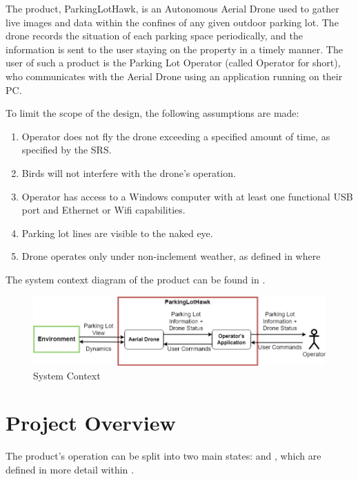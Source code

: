 \documentclass[12pt, titlepage]{article}
\begin{document}
The product, ParkingLotHawk, is an Autonomous Aerial Drone used to gather live images and data within the confines of any given outdoor parking lot. The drone records the situation of each parking space periodically, and the information is sent to the user staying on the property in a timely manner. The user of such a product is the Parking Lot Operator (called Operator for short), who communicates with the Aerial Drone using an application running on their PC.

To limit the scope of the design, the following assumptions are made:
\begin{enumerate}
    \item Operator does not fly the drone exceeding a specified amount of time, as specified by the SRS.
    \item Birds will not interfere with the drone's operation.
    \item Operator has access to a Windows computer with at least one functional USB port and Ethernet or Wifi capabilities.
    \item Parking lot lines are visible to the naked eye.
    \item Drone operates only under non-inclement weather, as defined in where 
\end{enumerate}

The system context diagram of the product can be found in .

\begin{figure}[h!]
  \begin{center} 
  \caption{System Context}
  \label{SystemContext}
        \includegraphics[width=1\textwidth]{SystemContext.png}
  \end{center}
\end{figure}

\section{Project Overview}

The product's operation can be split into two main states:  and , which are defined in more detail within .
\end{document}

